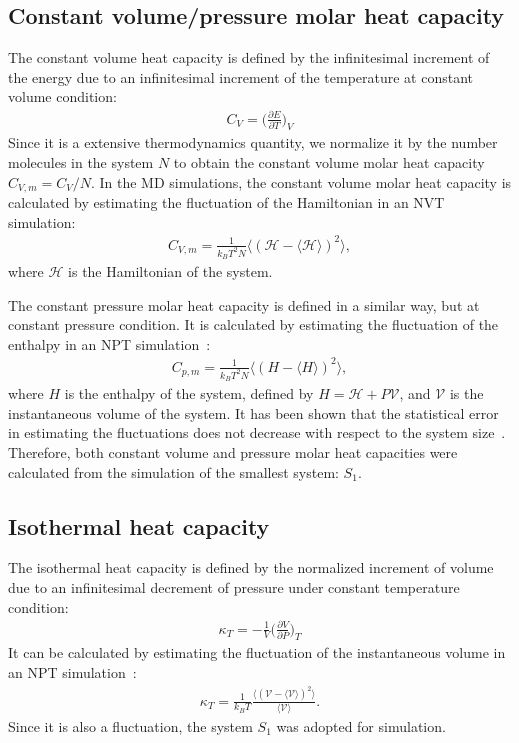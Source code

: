 \documentclass[aip,jcp,a4paper,preprint,unsortedaddress,onecolumn,fleqn]{revtex4-1}
\newcommand{\systemsb}{S_1}
\begin{document}
\subsection{Constant volume/pressure molar heat capacity}

The constant volume heat capacity is defined by the infinitesimal
increment of the energy due to an infinitesimal increment of the temperature
at constant volume condition: 
\begin{align}
  C_V = \Big(\frac{\partial E}{\partial T}\Big)_V
\end{align}
Since it is a extensive thermodynamics quantity, we  normalize
it by the number molecules in the system $N$ to obtain the
constant volume molar heat capacity $C_{V,m} = C_V/N$.
In the MD simulations, 
the constant volume molar heat capacity is calculated by estimating the
fluctuation of the Hamiltonian in an NVT simulation:
\begin{align}
  C_{V,m} = \frac{1}{k_BT^2 N} \langle (\mathcal H - \langle\mathcal H\rangle)^2 \rangle,
\end{align}
where $\mathcal H$ is the 
Hamiltonian of the system. 

The constant pressure molar heat capacity is defined in
a similar way, but at constant pressure
condition. 
It is calculated by estimating
the fluctuation of the enthalpy in an NPT simulation~\cite{wang2011existence}:
\begin{align}
  C_{p,m} = \frac{1}{k_BT^2 N} \langle ( H - \langle H\rangle)^2 \rangle,
\end{align}
where $ H$ is the enthalpy of the system,
defined by $H = \mathcal H + P\mathcal V$, and $\mathcal V$ is the instantaneous volume
of the system.
It has been shown that the statistical error in estimating
the fluctuations does not decrease with
respect to the system size~\cite{milchev1986fluctuations,ferrenberg1991statistical}.
Therefore, both constant volume and pressure molar heat capacities
were calculated from the simulation of the smallest system: $\systemsb$.

\subsection{Isothermal heat capacity}
The isothermal heat capacity is defined
by the normalized increment of volume due to an infinitesimal
decrement of pressure under constant temperature condition:
\begin{align}
  \kappa_T = - \frac 1V \Big(\frac{\partial V}{\partial P}\Big)_T
\end{align}
It can be calculated by estimating the fluctuation
of the instantaneous volume in an NPT simulation~\cite{wang2011existence}:
\begin{align}
  \kappa_T = \frac{1}{k_BT} \frac{\langle (\mathcal V - \langle \mathcal V\rangle)^2 \rangle}{\langle \mathcal V\rangle}.
\end{align}
Since it is also a fluctuation, the system $\systemsb$ was adopted for simulation.
\end{document}
